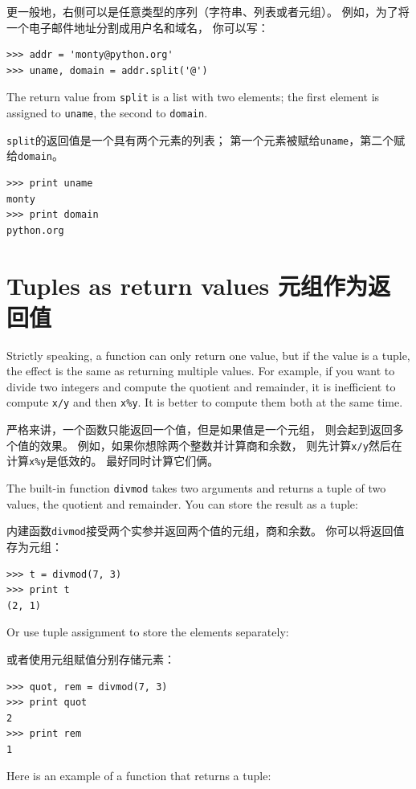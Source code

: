 \documentclass[10pt]{book}
\begin{document}
\begin{CJK}{UTF8}{gbsn}
更一般地，右侧可以是任意类型的序列（字符串、列表或者元组）。
例如，为了将一个电子邮件地址分割成用户名和域名，
你可以写：

\begin{verbatim}
>>> addr = 'monty@python.org'
>>> uname, domain = addr.split('@')
\end{verbatim}
%
The return value from {\tt split} is a list with two elements;
the first element is assigned to {\tt uname}, the second to
{\tt domain}.

{\tt split}的返回值是一个具有两个元素的列表；
第一个元素被赋给{\tt uname}，第二个赋给{\tt domain}。

\begin{verbatim}
>>> print uname
monty
>>> print domain
python.org
\end{verbatim}
%

\section{Tuples as return values 元组作为返回值}

Strictly speaking, a function can only return one value, but
if the value is a tuple, the effect is the same as returning
multiple values.  For example, if you want to divide two integers
and compute the quotient and remainder, it is inefficient to
compute {\tt x/y} and then {\tt x\%y}.  It is better to compute
them both at the same time.

严格来讲，一个函数只能返回一个值，但是如果值是一个元组，
则会起到返回多个值的效果。
例如，如果你想除两个整数并计算商和余数，
则先计算{\tt x/y}然后在计算{\tt x\%y}是低效的。
最好同时计算它们俩。

The built-in function {\tt divmod} takes two arguments and
returns a tuple of two values, the quotient and remainder.
You can store the result as a tuple:

内建函数{\tt divmod}接受两个实参并返回两个值的元组，商和余数。
你可以将返回值存为元组：

\begin{verbatim}
>>> t = divmod(7, 3)
>>> print t
(2, 1)
\end{verbatim}
%
Or use tuple assignment to store the elements separately:

或者使用元组赋值分别存储元素：

\begin{verbatim}
>>> quot, rem = divmod(7, 3)
>>> print quot
2
>>> print rem
1
\end{verbatim}
%
Here is an example of a function that returns a tuple:


\end{CJK}
\end{document}
